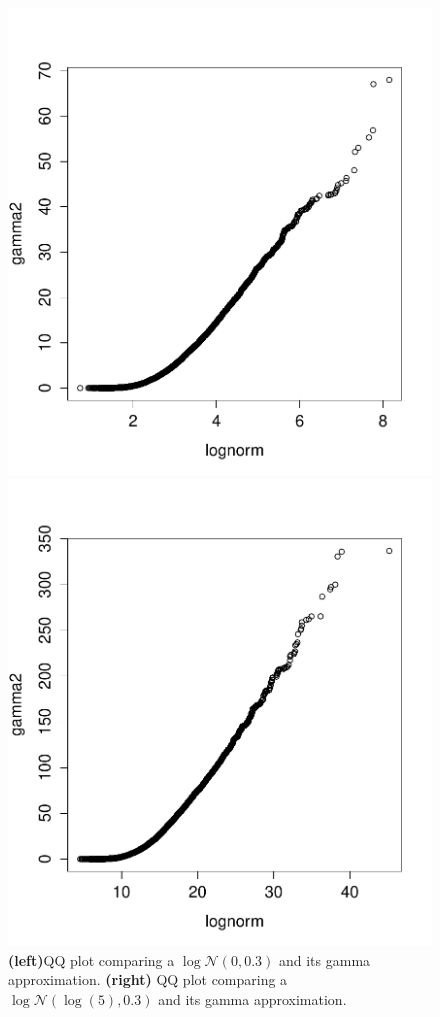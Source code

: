 \documentclass{article}
\begin{document}
\begin{figure}[htb]
	\centering
	\begin{minipage}{.45\textwidth}
		\centering
		\includegraphics[width=0.97\linewidth]{bootstrap-filter/approx203.pdf}
	\end{minipage}
	\begin{minipage}{.45\textwidth}
		\centering
		\includegraphics[width=0.97\linewidth]{bootstrap-filter/approx2coeff5sigma03.pdf}
	\end{minipage}
	\caption{\textbf{(left)}QQ plot comparing a $\log\mathcal{N}(0, 0.3)$ and its gamma approximation. \textbf{(right)} QQ plot comparing a $\log\mathcal{N}(\log(5), 0.3)$ and its gamma approximation.}
	\label{fig:approx2}
\end{figure}
\end{document}

